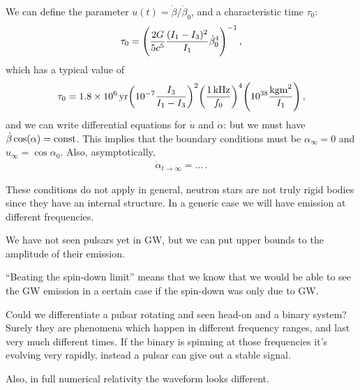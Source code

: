 \documentclass[main.tex]{subfiles}
\begin{document}
We can define the parameter \(u(t) = \dot{\beta} / \dot{\beta}_{0}\), and a characteristic time \(\tau_0 \): 
%
\begin{align}
\tau_0  = \qty( \frac{2G}{5 c^{5}} \frac{(I_1 - I_3 )^2}{I_1  } \dot{\beta}_{0}^{4})^{-1}
\,,
\end{align}
%
which has a typical value of 
%
\begin{align}
\tau_0 = \SI{1.8e6}{yr} \qty(\num{e-7} \frac{I_3 }{I_1 - I_3 })^2 \qty( \frac{ \SI{1}{kHz}}{f_0 })^{4} \qty(\num{e38} \frac{\SI{}{kg m^2}}{I_1 })
\,,
\end{align}
%
and we can write differential equations for \(\dot{u}\) and \(\dot{\alpha}\): but we must have \(\dot{\beta} \cos(\alpha ) = \text{const}\). 
This implies that the boundary conditions must be \(\alpha_{ \infty } = 0\) and \(u_{ \infty } = \cos \alpha_0 \). Also, asymptotically, 
%
\begin{align}
\dot{\alpha}_{t \to \infty } = \dots
\,.
\end{align}

These conditions do not apply in general, neutron stars are not truly rigid bodies since they have an internal structure. 
In a generic case we will have emission at different frequencies. 

We have not seen pulsars yet in GW, but we can put upper bounds to the amplitude of their emission. 

``Beating the spin-down limit'' means that we know that we would be able to see the GW emission in a certain case if the spin-down was only due to GW.

Could we differentiate a pulsar rotating and seen head-on and a binary system? 
Surely they are phenomena which happen in different frequency ranges, and last very much different times. 
If the binary is spinning at those frequencies it's evolving very rapidly, instead a pulsar can give out a stable signal. 

Also, in full numerical relativity the waveform looks different. 
\end{document}
